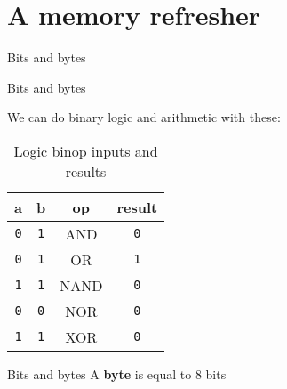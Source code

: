 \documentclass[../index.tex]{subfiles}
\begin{document}
\renewcommand{\sectiontitle}{A memory refresher}
\section{\sectiontitle}

\renewcommand{\currenttitle}{Bits and bytes}
\begin{frame}{\currenttitle}
%
   \\
\end{frame}

\begin{frame}{\currenttitle}
  \newcommand{\false}{\texttt{0}}
  \newcommand{\true}{\texttt{1}}

  We can do binary logic and arithmetic with these:

  \begin{table}
    \begin{tabular}{c c c c}
      a & b & op & result \\
      \hline{}
      \false{} & \true{} & AND & \false{} \\
      \false{} & \true{} & OR & \true{} \\
      \true{} & \true{} & NAND & \false{} \\
      \false{} & \false{} & NOR & \false{} \\
      \true{} & \true{} & XOR & \false{}
    \end{tabular}
    \caption{Logic binop inputs and results}
  \end{table}
\end{frame}

\begin{frame}{\currenttitle}
  A \textbf{byte} is equal to 8 bits
\end{frame}
\end{document}
